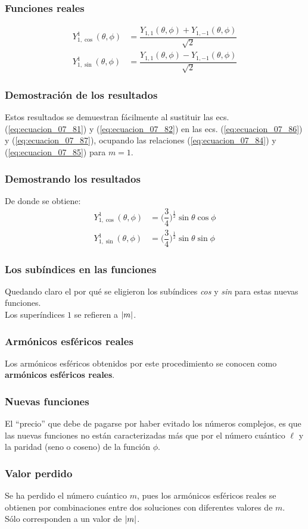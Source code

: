 \documentclass[12pt]{beamer}
\begin{document}
\begin{frame}
\frametitle{Funciones reales}
\begin{align}
Y_{1, \cos}^{1} (\theta, \phi) &= \dfrac{Y_{1,1} (\theta, \phi) + Y_{1, -1} (\theta, \phi)}{\sqrt{2}} \label{eq:ecuacion_07_86} \\[0.5em]
Y_{1, \sin}^{1} (\theta, \phi) &= \dfrac{Y_{1,1} (\theta, \phi) - Y_{1, -1} (\theta, \phi)}{\sqrt{2}} \label{eq:ecuacion_07_87}
\end{align}
\end{frame}
\begin{frame}
\frametitle{Demostración de los resultados}
Estos resultados se demuestran fácilmente al sustituir las ecs. (\ref{eq:ecuacion_07_81}) y (\ref{eq:ecuacion_07_82}) en las ecs. (\ref{eq:ecuacion_07_86}) y (\ref{eq:ecuacion_07_87}), ocupando las relaciones (\ref{eq:ecuacion_07_84}) y (\ref{eq:ecuacion_07_85}) para $m = 1$.
\end{frame}
\begin{frame}
\frametitle{Demostrando los resultados}
De donde se obtiene:
\pause
\begin{align}
Y_{1, \cos}^{1} (\theta, \phi) &= \bigg( \dfrac{3}{4} \bigg)^{\frac{1}{2}} \sin \theta \cos \phi \label{eq:ecuacion_07_88} \\[0.5em]
Y_{1, \sin}^{1} (\theta, \phi) &= \bigg( \dfrac{3}{4} \bigg)^{\frac{1}{2}} \sin \theta \sin \phi \label{eq:ecuacion_07_89}
\end{align}
\end{frame}
\begin{frame}
\frametitle{Los subíndices en las funciones}
Quedando claro el por qué se eligieron los subíndices \emph{cos} y \emph{sin} para estas nuevas funciones.
\\
\bigskip
\pause
Los superíndices $1$ se refieren a $\abs{m}$.
\end{frame}
\begin{frame}
\frametitle{Armónicos esféricos reales}
Los armónicos esféricos obtenidos por este procedimiento se conocen como \textbf{\textcolor{cordovan}{armónicos esféricos reales}}.
\end{frame}
\begin{frame}
\frametitle{Nuevas funciones}
El \enquote{precio} que debe de pagarse por haber evitado los números complejos, \pause es que las nuevas funciones no están caracterizadas más que por el número cuántico $\ell$ y la paridad (seno o coseno) de la función $\phi$.
\end{frame}
\begin{frame}
\frametitle{Valor perdido}
Se ha perdido el número cuántico $m$, pues los armónicos esféricos reales se obtienen por combinaciones entre dos soluciones con diferentes valores de $m$.
\\
\bigskip
\pause
Sólo corresponden a un valor de $\abs{m}$.
\end{frame}
\end{document}
